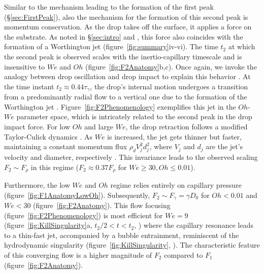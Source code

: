 \documentclass{jfm}
\begin{document}
Similar to the mechanism leading to the formation of the first peak (\S\ref{sec:FirstPeak}), also the mechanism for the formation of this second peak is momentum conservation. As the drop takes off the surface, it applies a force on the substrate. As noted in \S\ref{sec:intro} and \citet{zhang2022impact}, this force also coincides with the formation of a Worthington jet (figure~\ref{fig:summary}iv-vi). The time $t_2$ at which the second peak is observed scales with the inertio-capillary timescale and is insensitive to $We$ and $Oh$ (figure~\ref{fig:F2Anatomy}b,c). Once again, we invoke the analogy between drop oscillation and drop impact to explain this behavior  \citep{Richard2002, chevy2012liquid}. At the time instant $t_2 \approx 0.44\tau_\gamma$, the drop's internal motion undergoes a transition from a predominantly radial flow to a vertical one due to the formation of the Worthington jet \citep{chantelot2018rebonds, zhang2022impact}. Figure~\ref{fig:F2Phenomenology} exemplifies this jet in the $Oh$-$We$ parameter space, which is intricately related to the second peak in the drop impact force. For low $Oh$ and large $We$, the drop retraction follows a modified Taylor-Culick dynamics \citep{bartolo2005retraction, Eggers2010, sanjay2022TC}. As $We$ is increased, the jet gets thinner but faster, maintaining a constant momentum flux $\rho_dV_j^2d_j^2$, where $V_j$ and $d_j$ are the jet's velocity and diameter, respectively \citep[figure~\ref{fig:F2Phenomenology},][]{zhang2022impact}. This invariance leads to the observed scaling $F_2 \sim F_\rho$ in this regime ($F_2 \approx 0.37F_\rho$ for $We \ge 30, Oh \le 0.01$).

Furthermore, the low $We$ and $Oh$ regime relies entirely on capillary pressure (figure~\ref{fig:F1AnatomyLowOh}). Subsequently, $F_2 \sim F_\gamma = \gamma D_0$ for $Oh < 0.01$ and $We < 30$ (figure~\ref{fig:F2Anatomy}). This flow focusing (figure~\ref{fig:F2Phenomenology}) is most efficient for $We = 9$ (figure~\ref{fig:KillSingularity}a, $t_2/2 < t < t_2$, \citealp{renardy2003pyramidal, Bartolo2006Singular}) where the capillary resonance leads to a thin-fast jet, accompanied by a bubble entrainment, reminiscent of the hydrodynamic singularity (figure~\ref{fig:KillSingularity}, \citealp{zhang2022impact, sanjay_lohse_jalaal_2021}). The characteristic feature of this converging flow is a higher magnitude of $F_2$ compared to $F_1$ (figure~\ref{fig:F2Anatomy}). 
\end{document}
